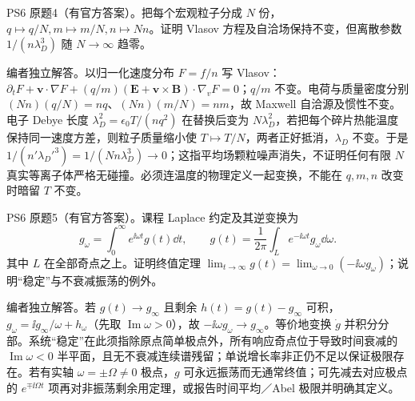 \begin{exercise}\label{ex:hist02-6-4}
PS6 原题4（有官方答案）。把每个宏观粒子分成 $N$ 份，$q\mapsto q/N,m\mapsto m/N,n\mapsto Nn$。证明 Vlasov 方程及自洽场保持不变，但离散参数 $1/(n\lambda_D^3)$ 随 $N\to\infty$ 趋零。
\end{exercise}
\begin{solution}
编者独立解答。以归一化速度分布 $F=f/n$ 写 Vlasov：$\partial_tF+\mathbf v\cdot\nabla F+(q/m)(\mathbf E+\mathbf v\times\mathbf B)\cdot\nabla_vF=0$；$q/m$ 不变。电荷与质量密度分别 $(Nn)(q/N)=nq$、$(Nn)(m/N)=nm$，故 Maxwell 自洽源及惯性不变。电子 Debye 长度 $\lambda_D^2=\epsilon_0T/(nq^2)$ 在替换后变为 $N\lambda_D^2$，若把每个碎片热能温度保持同一速度方差，则粒子质量缩小使 $T\mapsto T/N$，两者正好抵消，$\lambda_D$ 不变。于是 $1/(n'\lambda_D'^3)=1/(Nn\lambda_D^3)\to0$；这指平均场颗粒噪声消失，不证明任何有限 $N$ 真实等离子体严格无碰撞。必须连温度的物理定义一起变换，不能在 $q,m,n$ 改变时暗留 $T$ 不变。
\end{solution}

\begin{exercise}\label{ex:hist02-6-5}
PS6 原题5（有官方答案）。课程 Laplace 约定及其逆变换为\begin{equation}g_\omega=\int_0^\infty e^{\ii\omega t}g(t)\dd t,\qquad g(t)=\frac1{2\pi}\int_L e^{-\ii\omega t}g_\omega\dd\omega.\end{equation}其中 $L$ 在全部奇点之上。证明终值定理 $\lim_{t\to\infty}g(t)=\lim_{\omega\to0}(-\ii\omega g_\omega)$；说明“稳定”与不衰减振荡的例外。
\end{exercise}
\begin{solution}
编者独立解答。若 $g(t)\to g_\infty$ 且剩余 $h(t)=g(t)-g_\infty$ 可积，$g_\omega=\ii g_\infty/\omega+h_\omega$（先取 $\operatorname{Im}\omega>0$），故 $-\ii\omega g_\omega\to g_\infty$。等价地变换 $\dot g$ 并积分分部。系统“稳定”在此须指除原点简单极点外，所有响应奇点位于导致时间衰减的 $\operatorname{Im}\omega<0$ 半平面，且无不衰减连续谱残留；单说增长率非正仍不足以保证极限存在。若有实轴 $\omega=\pm\Omega\ne0$ 极点，$g$ 可永远振荡而无通常终值；可先减去对应极点的 $e^{\mp\ii\Omega t}$ 项再对非振荡剩余用定理，或报告时间平均／Abel 极限并明确其定义。
\end{solution}
